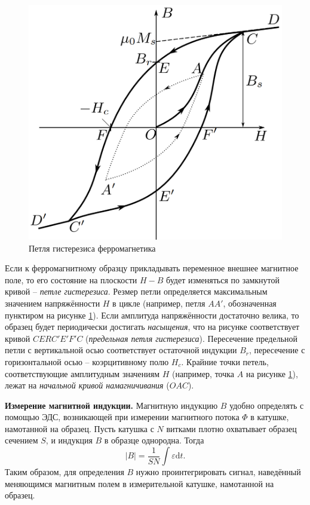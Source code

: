 \documentclass[a4paper,10pt]{article}
\begin{document}
\begin{figure}[h]
	\centering
	\includegraphics[scale=0.3]{lab345ris1.png}
	\caption{Петля гистерезиса ферромагнетика} \label{Theor}
\end{figure}

Если к ферромагнитному образцу прикладывать переменное внешнее магнитное поле, то его состояние на плоскости $H-B$ будет изменяться по замкнутой кривой -- \textit{петле гистерезиса}. Резмер петли определяется максимальным значением напряжённости $H$ в цикле (например, петля $AA'$, обозначенная пунктиром на рисунке \ref{Theor}). Если амплитуда напряжённости достаточно велика, то образец будет периодически достигать \textit{насыщения}, что на рисунке соответствует кривой $CERC'E'F'C$ (\textit{предельная петля гистерезиса}). Пересечение предельной петли с вертикальной осью соответствует остаточной индукции $B_r$, пересечение с горизонтальной осью -- коэрцитивному полю $H_c$. Крайние точки петель, соответствующие амплитудным значениям $H$ (например, точка $A$ на рисунке \ref{Theor}), лежат на \textit{начальной кривой намагничивания} ($OAC$).

\textbf{Измерение магнитной индукции.} Магнитную индукцию $B$ удобно определять с помощью ЭДС, возникающей при измерении магнитного потока $\Phi$ в катушке, намотанной на образец. Пусть катушка с $N$ витками плотно охватывает образец сечением $S$, и индукция $B$ в образце однородна. Тогда\[\left|B\right|=\frac{1}{SN}\int\varepsilon\text{d}t.\]Таким образом, для определения $B$ нужно проинтегрировать сигнал, наведённый меняющимся магнитным полем в измерительной катушке, намотанной на образец.
\end{document}
